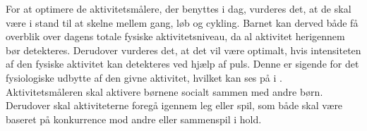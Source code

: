 For at optimere de aktivitetsmålere, der benyttes i dag, vurderes det, at de skal være i stand til at skelne mellem gang, løb og cykling. Barnet kan derved både få overblik over dagens totale fysiske aktivitetsniveau, da al aktivitet herigennem bør detekteres. %
Derudover vurderes det, at det vil være optimalt, hvis intensiteten af den fysiske aktivitet kan detekteres ved hjælp af puls. Denne er sigende for det fysiologiske udbytte af den givne aktivitet, hvilket kan ses på  i .\newline
Aktivitetsmåleren skal aktivere børnene socialt sammen med andre børn. Derudover skal aktiviteterne foregå igennem leg eller spil, som både skal være baseret på konkurrence mod andre eller sammenspil i hold.